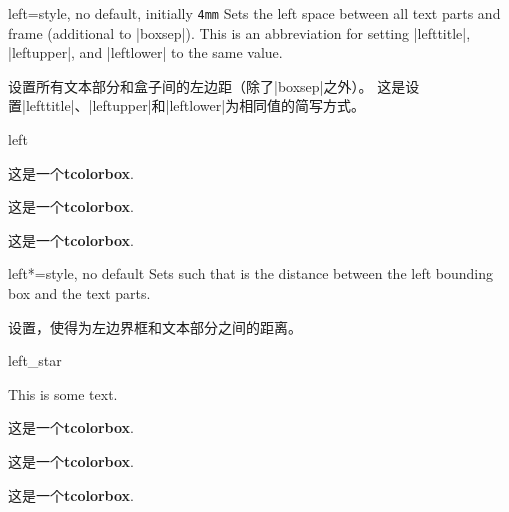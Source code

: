 \begin{docTcbKey}{left}{=}{style, no default, initially \texttt{4mm}}
Sets the left space between all text parts and frame (additional to |boxsep|).
This is an abbreviation for setting
|lefttitle|, |leftupper|, and |leftlower| to the same value.

设置所有文本部分和盒子间的左边距（除了|boxsep|之外）。 这是设置|lefttitle|、|leftupper|和|leftlower|为相同值的简写方式。


\begin{exdispExample}{left}

\begin{tcolorbox}
  这是一个\textbf{tcolorbox}.
  \end{tcolorbox}

\begin{tcolorbox}[left=0mm]
这是一个\textbf{tcolorbox}.
\end{tcolorbox}

\begin{tcolorbox}[left=10mm]
这是一个\textbf{tcolorbox}.
\end{tcolorbox}
\end{exdispExample}
\end{docTcbKey}

\begin{docTcbKey}[][doc new=2017-02-16]{left*}{=}{style, no default}
Sets  such that  is the distance between
the left bounding box and the text parts.

设置，使得为左边界框和文本部分之间的距离。


\begin{exdispExample}{left_star}

This is some text.
\begin{tcolorbox}[grow to left by=5mm,left*=0mm,
enhanced,show bounding box]
这是一个\textbf{tcolorbox}.
\end{tcolorbox}

\begin{tcolorbox}[left*=0mm,
enhanced,show bounding box]
这是一个\textbf{tcolorbox}.
\end{tcolorbox}

\begin{tcolorbox}
这是一个\textbf{tcolorbox}.
\end{tcolorbox}
\end{exdispExample}
\end{docTcbKey}

